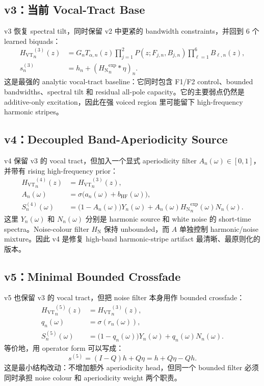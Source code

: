 \documentclass[11pt,fontset=none]{ctexart}
\newcommand{\src}{s}
\newcommand{\harm}{h}
\newcommand{\noise}{\eta}
\newcommand{\vt}{H_{\mathrm{VT}}}
\newcommand{\nfilt}{H_{\mathrm{N}}}
\newcommand{\ap}{A}
\newcommand{\biquad}{B}
\newcommand{\pole}{P}
\begin{document}
\subsection{v3：当前 Vocal-Tract Base}

v3 恢复 spectral tilt，同时保留 v2 中更紧的 bandwidth constraints，并回到 6 个
learned biquads：
\begin{align}
  {\vt}^{(3)}_n(z)
  &=
  G_n T_{\alpha,n}(z)
  \prod_{j=1}^{2}\pole(z;F_{j,n},B_{j,n})
  \prod_{\ell=1}^{6}\biquad_{\ell,n}(z),\\
  \src^{(3)}_n
  &=
  \harm_n + ({\nfilt}^{\exp}_n * \noise)_n.
\end{align}
这是最强的 analytic vocal-tract baseline：它同时包含 F1/F2 control、bounded
bandwidths、spectral tilt 和 residual all-pole capacity。它的主要弱点仍然是
additive-only excitation，因此在强 voiced region 里可能留下 high-frequency harmonic stripes。

\subsection{v4：Decoupled Band-Aperiodicity Source}

v4 保留 v3 的 vocal tract，但加入一个显式 aperiodicity filter
$\ap_n(\omega)\in[0,1]$，并带有 rising high-frequency prior：
\begin{align}
  {\vt}^{(4)}_n(z) &= {\vt}^{(3)}_n(z),\\
  \ap_n(\omega)
  &=
  \sigma\bigl(a_n(\omega)+b_{\mathrm{HF}}(\omega)\bigr),\\
  S^{(4)}_n(\omega)
  &=
  \bigl(1-\ap_n(\omega)\bigr)Y_n(\omega)
  +
  \ap_n(\omega){\nfilt}^{\exp}_n(\omega)N_n(\omega).
\end{align}
这里 $Y_n(\omega)$ 和 $N_n(\omega)$ 分别是 harmonic source 和 white noise 的 short-time
spectra。Noise-colour filter $\nfilt$ 保持 unbounded，而 $\ap$ 单独控制 harmonic/noise
mixture。因此 v4 是修复 high-band harmonic-stripe artifact 最清晰、最原则化的版本。

\subsection{v5：Minimal Bounded Crossfade}

v5 也保留 v3 的 vocal tract，但把 noise filter 本身用作 bounded crossfade：
\begin{align}
  {\vt}^{(5)}_n(z) &= {\vt}^{(3)}_n(z),\\
  q_n(\omega) &= \sigma(r_n(\omega)),\\
  S^{(5)}_n(\omega)
  &=
  \bigl(1-q_n(\omega)\bigr)Y_n(\omega)
  +
  q_n(\omega)N_n(\omega).
\end{align}
等价地，用 operator form 可以写成：
\begin{equation}
  \src^{(5)}
  =
  (I-Q)\harm + Q\noise
  =
  \harm + Q\noise - Q\harm.
\end{equation}
这是最小结构改动：不增加额外 aperiodicity head，但同一个 bounded filter 必须同时承担
noise colour 和 aperiodicity weight 两个职责。
\end{document}
